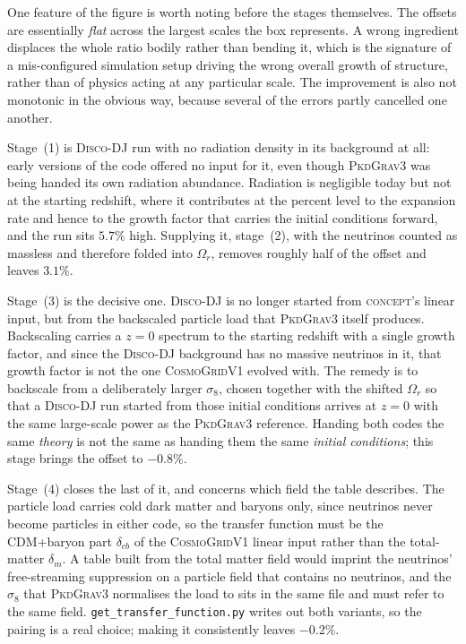 \documentclass{report}
\begin{document}
One feature of the figure is worth noting before the stages themselves. The offsets are
essentially \emph{flat} across the largest scales the box represents. A wrong ingredient
displaces the whole ratio bodily rather than bending it, which is the signature of a
mis-configured simulation setup driving the wrong overall growth of structure, rather than of
physics acting at any particular scale. The improvement is also not monotonic in the obvious way,
because several of the errors partly cancelled one another.

Stage~(1) is \textsc{Disco-DJ} run with no radiation density in its background at all: early
versions of the code offered no input for it, even though \textsc{PkdGrav3} was being handed its
own radiation abundance. Radiation is negligible today but not at the starting redshift, where it
contributes at the percent level to the expansion rate and hence to the growth factor that
carries the initial conditions forward, and the run sits \mbox{$5.7\%$} high. Supplying it,
stage~(2), with the neutrinos counted as massless and therefore folded into \mbox{$\Omega_r$}, removes
roughly half of the offset and leaves \mbox{$3.1\%$}.

Stage~(3) is the decisive one. \textsc{Disco-DJ} is no longer started from \textsc{concept}'s
linear input, but from the backscaled particle load that \textsc{PkdGrav3} itself produces.
Backscaling carries a \mbox{$z=0$} spectrum to the starting redshift with a single growth factor, and
since the \textsc{Disco-DJ} background has no massive neutrinos in it, that growth factor is not
the one \textsc{CosmoGridV1} evolved with. The remedy is to backscale from a deliberately
larger \mbox{$\sigma_8$}, chosen together with the shifted \mbox{$\Omega_r$} so that a \textsc{Disco-DJ}
run started from those initial conditions arrives at \mbox{$z=0$} with the same large-scale power as the \textsc{PkdGrav3} reference. Handing both codes the same \emph{theory} is not the same as handing them the same
\emph{initial conditions}; this stage brings the offset to \mbox{$-0.8\%$}.

Stage~(4) closes the last of it, and concerns which field the table describes. The particle load
carries cold dark matter and baryons only, since neutrinos never become particles in either code,
so the transfer function must be the CDM+baryon part \mbox{$\delta_{cb}$} of the \textsc{CosmoGridV1}
linear input rather than the total-matter \mbox{$\delta_m$}. A table built from the total matter field
would imprint the neutrinos' free-streaming suppression on a particle field that contains no
neutrinos, and the \mbox{$\sigma_8$} that \textsc{PkdGrav3} normalises the load to sits in the same file
and must refer to the same field. \texttt{get\_transfer\_function.py} writes out both variants, so
the pairing is a real choice; making it consistently leaves \mbox{$-0.2\%$}.
\end{document}
